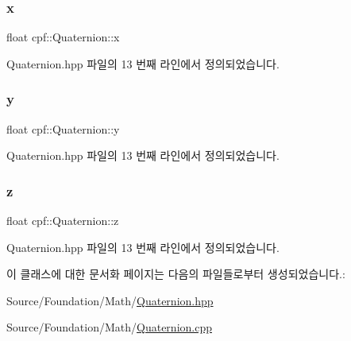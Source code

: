 \mbox{\label{classcpf_1_1_quaternion_a200f7bce4e673281af8cc7dd75cb0677}} 
\subsubsection{\texorpdfstring{x}{x}}
{\footnotesize\ttfamily float cpf\+::\+Quaternion\+::x}



Quaternion.\+hpp 파일의 13 번째 라인에서 정의되었습니다.

\mbox{\label{classcpf_1_1_quaternion_a4fbade6e58be55a49c94e7f157988136}} 
\subsubsection{\texorpdfstring{y}{y}}
{\footnotesize\ttfamily float cpf\+::\+Quaternion\+::y}



Quaternion.\+hpp 파일의 13 번째 라인에서 정의되었습니다.

\mbox{\label{classcpf_1_1_quaternion_ade9c41b717605118e5fdf95d96a843b4}} 
\subsubsection{\texorpdfstring{z}{z}}
{\footnotesize\ttfamily float cpf\+::\+Quaternion\+::z}



Quaternion.\+hpp 파일의 13 번째 라인에서 정의되었습니다.



이 클래스에 대한 문서화 페이지는 다음의 파일들로부터 생성되었습니다.\+:\begin{DoxyCompactItemize}
\item 
Source/\+Foundation/\+Math/\hyperlink{_quaternion_8hpp}{Quaternion.\+hpp}\item 
Source/\+Foundation/\+Math/\hyperlink{_quaternion_8cpp}{Quaternion.\+cpp}\end{DoxyCompactItemize}
